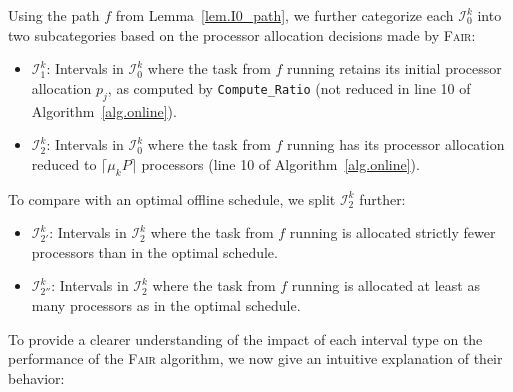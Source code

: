 \documentclass{article}
\begin{document}
Using the path $f$ from Lemma~\ref{lem.I0_path}, we further categorize each $\mathcal{I}_0^k$ into two subcategories based on the processor allocation decisions made by \textsc{Fair}:

\begin{itemize}
    \item $\mathcal{I}_1^k$: Intervals in $\mathcal{I}_0^k$ where the task from $f$ running retains its initial processor allocation $p_j$, as computed by \texttt{Compute\_Ratio} (not reduced in line 10 of Algorithm~\ref{alg.online}).
    \item $\mathcal{I}_2^k$: Intervals in $\mathcal{I}_0^k$ where the task from $f$ running has its processor allocation reduced to $\lceil \mu_k P \rceil$ processors (line 10 of Algorithm~\ref{alg.online}).
\end{itemize}


To compare with an optimal offline schedule, we split $\mathcal{I}_2^k$ further:

\begin{itemize}
    \item $\mathcal{I}_{2'}^k$: Intervals in $\mathcal{I}_2^k$ where the task from $f$ running is allocated strictly fewer processors than in the optimal schedule.
    \item $\mathcal{I}_{2''}^k$: Intervals in $\mathcal{I}_2^k$ where the task from $f$ running is allocated at least as many processors as in the optimal schedule.
\end{itemize}
\vspace{0.3cm}

To provide a clearer understanding of the impact of each interval type on the performance of the \textsc{Fair} algorithm, we now give an intuitive explanation of their behavior:
\end{document}
